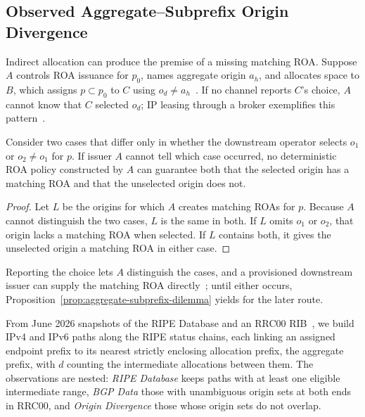 \subsection{Observed Aggregate--Subprefix Origin Divergence}
\label{sec:observed-divergence}

Indirect allocation can produce the premise of a missing matching ROA. Suppose $A$ controls ROA issuance for $p_0$, names aggregate origin $a_h$, and allocates space to $B$, which assigns $p\subset p_0$ to $C$ using $o_d\neq a_h$~\cite{rfc6480}. If no channel reports $C$'s choice, $A$ cannot know that $C$ selected $o_d$; IP leasing through a broker exemplifies this pattern~\cite{leasing2026}.

\begin{proposition}
\label{prop:origin-choice-visibility}
Consider two cases that differ only in whether the downstream operator selects $o_1$ or $o_2\neq o_1$ for $p$. If issuer $A$ cannot tell which case occurred, no deterministic ROA policy constructed by $A$ can guarantee both that the selected origin has a matching ROA and that the unselected origin does not.
\end{proposition}
\begin{proof}
Let $L$ be the origins for which $A$ creates matching ROAs for $p$. Because $A$ cannot distinguish the two cases, $L$ is the same in both. If $L$ omits $o_1$ or $o_2$, that origin lacks a matching ROA when selected. If $L$ contains both, it gives the unselected origin a matching ROA in either case.
\end{proof}

Reporting the choice lets $A$ distinguish the cases, and a provisioned downstream issuer can supply the matching ROA directly~\cite{rfc6480,rfc9582}; until either occurs, Proposition~\ref{prop:aggregate-subprefix-dilemma} yields \invalid{} for the later route.

From June 2026 snapshots of the RIPE Database and an RRC00 RIB~\cite{ripe-db,ripe-ris}, we build IPv4 and IPv6 paths along the RIPE status chains, each linking an assigned endpoint prefix to its nearest strictly enclosing allocation prefix, the aggregate prefix, with $d$ counting the intermediate allocations between them. The observations are nested: \emph{RIPE Database} keeps paths with at least one eligible intermediate range, \emph{BGP Data} those with unambiguous origin sets at both ends in RRC00, and \emph{Origin Divergence} those whose origin sets do not overlap.

